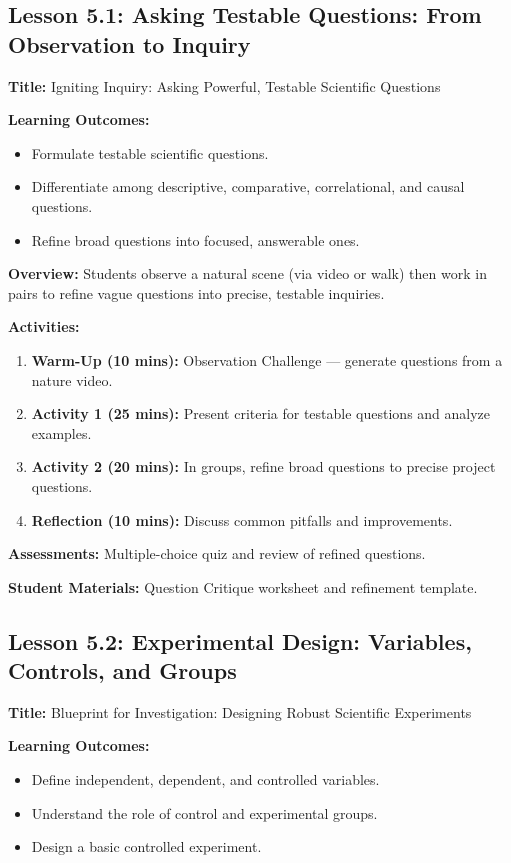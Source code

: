 \documentclass{tufte-book}
\begin{document}
\subsection{Lesson 5.1: Asking Testable Questions: From Observation to Inquiry}
\textbf{Title:} Igniting Inquiry: Asking Powerful, Testable Scientific Questions

\medskip
\textbf{Learning Outcomes:}
\begin{itemize}[leftmargin=*, label={\textbullet}]
    \item Formulate testable scientific questions.
    \item Differentiate among descriptive, comparative, correlational, and causal questions.
    \item Refine broad questions into focused, answerable ones.
\end{itemize}

\medskip
\textbf{Overview:}  
Students observe a natural scene (via video or walk) then work in pairs to refine vague questions into precise, testable inquiries.

\medskip
\textbf{Activities:}
\begin{enumerate}[label=\arabic*.]
    \item \textbf{Warm-Up (10 mins):} Observation Challenge — generate questions from a nature video.
    \item \textbf{Activity 1 (25 mins):} Present criteria for testable questions and analyze examples.
    \item \textbf{Activity 2 (20 mins):} In groups, refine broad questions to precise project questions.
    \item \textbf{Reflection (10 mins):} Discuss common pitfalls and improvements.
\end{enumerate}

\medskip
\textbf{Assessments:}  
Multiple-choice quiz and review of refined questions.

\medskip
\textbf{Student Materials:}  
Question Critique worksheet and refinement template.

\subsection{Lesson 5.2: Experimental Design: Variables, Controls, and Groups}
\textbf{Title:} Blueprint for Investigation: Designing Robust Scientific Experiments

\medskip
\textbf{Learning Outcomes:}
\begin{itemize}[leftmargin=*, label={\textbullet}]
    \item Define independent, dependent, and controlled variables.
    \item Understand the role of control and experimental groups.
    \item Design a basic controlled experiment.
\end{itemize}
\end{document}
